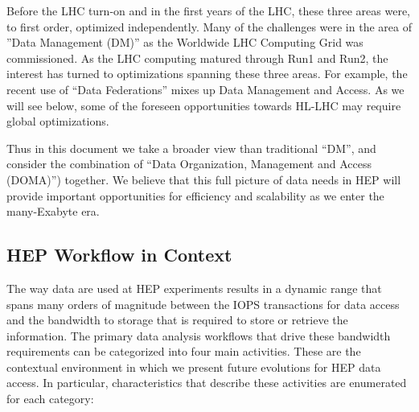 \documentclass[12pt,a4paper]{article}
\begin{document}
Before the LHC turn-on and in the first years of the LHC, these three
areas were, to first order, optimized independently. Many of the
challenges were in the area of ''Data Management (DM)'' as the Worldwide
LHC Computing Grid was commissioned. As the LHC computing matured
through Run1 and Run2, the interest has turned to optimizations spanning
these three areas. For example, the recent use of ``Data Federations''
mixes up Data Management and Access. As we will see below, some of the
foreseen opportunities towards HL-LHC may require global optimizations.

Thus in this document we take a broader view than traditional ``DM'',
and consider the combination of ``Data Organization, Management and
Access (DOMA)'') together. We believe that this full picture of data
needs in HEP will provide important opportunities for efficiency and
scalability as we enter the many-Exabyte era.

\subsection{HEP Workflow in Context}\label{hep-workflow-in-context}

The way data are used at HEP experiments results in a dynamic range that
spans many orders of magnitude between the IOPS transactions for data
access and the bandwidth to storage that is required to store or
retrieve the information. The primary data analysis workflows that drive
these bandwidth requirements can be categorized into four main
activities. These are the contextual environment in which we present
future evolutions for HEP data access. In particular, characteristics
that describe these activities are enumerated for each category:
\end{document}
